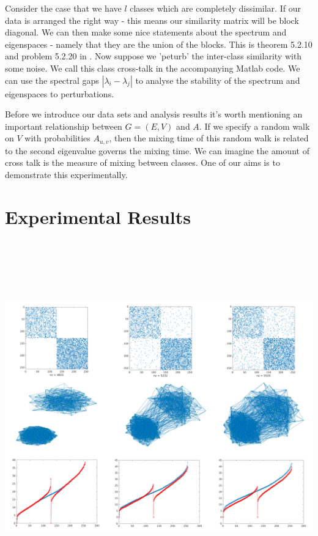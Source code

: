 Consider the case that we have $l$ classes which are completely dissimilar. If our data is arranged the right way - this means our similarity matrix will be block diagonal. We can then make some nice statements about the spectrum and eigenspaces - namely that they are the union of the blocks. This is theorem 5.2.10 and problem 5.2.20 in \cite{watkins2004fundamentals}.  Now suppose we 'peturb' the inter-class similarity with some noise.  We call this class cross-talk in the accompanying Matlab code. We can use the spectral gaps $| \lambda_i - \lambda_j |$ to analyse the stability of the spectrum and eigenspaces to perturbations. 

Before we introduce our data sets and analysis results it's worth mentioning an important relationship between $G=(E,V)$ and $A$.  If we specify a random walk on $V$ with probabilities $A_{u,v}$, then the mixing time of this random walk is related to the second eigenvalue governs the mixing time.  We can imagine the amount of cross talk is the measure of mixing between classes. One of our aims is to demonstrate this experimentally. 

\section*{Experimental Results}

\includegraphics[width=6in,height=6in]{images/2class_gap.png}


